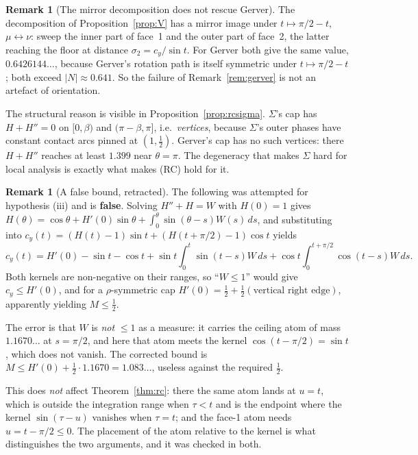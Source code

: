\documentclass[11pt]{article}
\theoremstyle{definition}
\newtheorem{remark}[theorem]{Remark}
\newcommand{\Sig}{\Sigma}
\begin{document}
\begin{remark}[The mirror decomposition does not rescue Gerver]\label{rem:mirror}
The decomposition of Proposition~\ref{prop:V} has a mirror image under
$t\mapsto\pi/2-t$, $\mu\leftrightarrow\nu$: sweep the inner part of face~1 and the outer
part of face~2, the latter reaching the floor at distance $\sigma_2=c_y/\sin t$. For
Gerver both give the same value, $0.6426144\ldots$, because Gerver's rotation path is
itself symmetric under $t\mapsto\pi/2-t$; both exceed $|N|\approx0.641$. So the failure of
Remark~\ref{rem:gerver} is not an artefact of orientation.

The structural reason is visible in Proposition~\ref{prop:rcsigma}. $\Sig$'s cap has
$H+H''=0$ on $[0,\beta)$ and $(\pi-\beta,\pi]$, i.e.\ \emph{vertices}, because $\Sig$'s
outer phases have constant contact arcs pinned at $(1,\tfrac12)$. Gerver's cap has no such
vertices: there $H+H''$ reaches at least $1.399$ near $\theta=\pi$. The degeneracy that makes
$\Sig$ hard for local analysis is exactly what makes (RC) hold for it.
\end{remark}

\begin{remark}[A false bound, retracted]\label{rem:retract}
The following was attempted for hypothesis (iii) and is \textbf{false}. Solving
$H''+H=W$ with $H(0)=1$ gives
$H(\theta)=\cos\theta+H'(0)\sin\theta+\int_0^\theta\sin(\theta-s)W(s)\,ds$, and
substituting into $c_y(t)=(H(t)-1)\sin t+(H(t+\pi/2)-1)\cos t$ yields
\[
  c_y(t)=H'(0)-\sin t-\cos t+\sin t\!\int_0^t\!\sin(t-s)W\,ds
        +\cos t\!\int_0^{t+\pi/2}\!\cos(t-s)W\,ds .
\]
Both kernels are non-negative on their ranges, so ``$W\le1$'' would give $c_y\le H'(0)$,
and for a $\rho$-symmetric cap $H'(0)=\tfrac12+\tfrac12(\text{vertical right edge})$,
apparently yielding $M\le\tfrac12$.

The error is that $W$ is \emph{not} $\le1$ as a measure: it carries the ceiling atom of
mass $1.1670\ldots$ at $s=\pi/2$, and here that atom meets the kernel
$\cos(t-\pi/2)=\sin t$, which does not vanish. The corrected bound is
$M\le H'(0)+\tfrac12\cdot1.1670=1.083\ldots$, useless against the required $\tfrac12$.

This does \emph{not} affect Theorem~\ref{thm:rc}: there the same atom lands at $u=t$,
which is outside the integration range when $\tau<t$ and is the endpoint where the kernel
$\sin(\tau-u)$ vanishes when $\tau=t$; and the face-1 atom needs $u=t-\pi/2\le0$. The
placement of the atom relative to the kernel is what distinguishes the two arguments, and
it was checked in both.
\end{remark}
\end{document}
